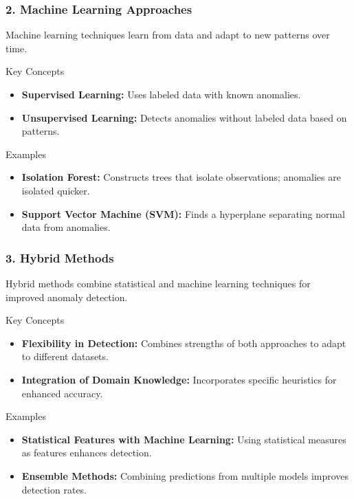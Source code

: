 \documentclass{beamer}
\begin{document}
\begin{frame}[fragile]
    \frametitle{2. Machine Learning Approaches}
    Machine learning techniques learn from data and adapt to new patterns over time.

    \begin{block}{Key Concepts}
        \begin{itemize}
            \item \textbf{Supervised Learning:} Uses labeled data with known anomalies.
            \item \textbf{Unsupervised Learning:} Detects anomalies without labeled data based on patterns.
        \end{itemize}
    \end{block}

    \begin{block}{Examples}
        \begin{itemize}
            \item \textbf{Isolation Forest:} Constructs trees that isolate observations; anomalies are isolated quicker.
            \item \textbf{Support Vector Machine (SVM):} Finds a hyperplane separating normal data from anomalies.
        \end{itemize}
    \end{block}
\end{frame}

\begin{frame}[fragile]
    \frametitle{3. Hybrid Methods}
    Hybrid methods combine statistical and machine learning techniques for improved anomaly detection.

    \begin{block}{Key Concepts}
        \begin{itemize}
            \item \textbf{Flexibility in Detection:} Combines strengths of both approaches to adapt to different datasets.
            \item \textbf{Integration of Domain Knowledge:} Incorporates specific heuristics for enhanced accuracy.
        \end{itemize}
    \end{block}

    \begin{block}{Examples}
        \begin{itemize}
            \item \textbf{Statistical Features with Machine Learning:} Using statistical measures as features enhances detection.
            \item \textbf{Ensemble Methods:} Combining predictions from multiple models improves detection rates.
        \end{itemize}
    \end{block}
\end{frame}
\end{document}
